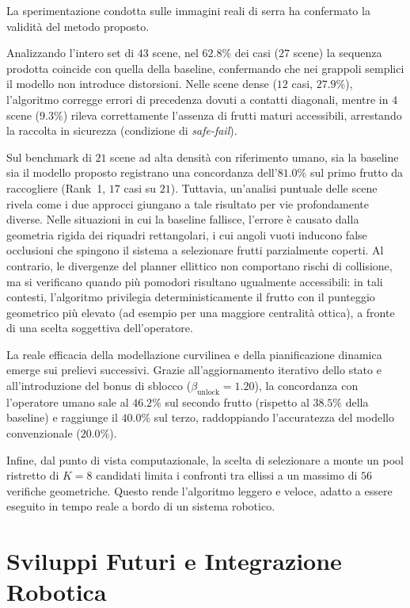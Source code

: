 La sperimentazione condotta sulle immagini reali di serra ha confermato la validità del 
metodo proposto. 

Analizzando l'intero set di $43$ scene, nel $62.8\%$ dei casi ($27$ scene) la sequenza 
prodotta coincide con quella della baseline, confermando che nei grappoli semplici il 
modello non introduce distorsioni. Nelle scene dense ($12$ casi, $27.9\%$), l'algoritmo 
corregge errori di precedenza dovuti a contatti diagonali, mentre in $4$ scene ($9.3\%$) 
rileva correttamente l'assenza di frutti maturi accessibili, arrestando la raccolta 
in sicurezza (condizione di \textit{safe-fail}).

Sul benchmark di $21$ scene ad alta densità con riferimento umano, sia la baseline sia 
il modello proposto registrano una concordanza dell'$81.0\%$ sul primo frutto da raccogliere 
(Rank~1, $17$ casi su $21$). Tuttavia, un'analisi puntuale delle scene rivela come i due 
approcci giungano a tale risultato per vie profondamente diverse. Nelle situazioni in cui 
la baseline fallisce, l'errore è causato dalla geometria rigida dei riquadri rettangolari, 
i cui angoli vuoti inducono false occlusioni che spingono il sistema a selezionare frutti 
parzialmente coperti. Al contrario, le divergenze del planner ellittico non comportano 
rischi di collisione, ma si verificano quando più pomodori risultano ugualmente accessibili: 
in tali contesti, l'algoritmo privilegia deterministicamente il frutto con il punteggio 
geometrico più elevato (ad esempio per una maggiore centralità ottica), a fronte di una 
scelta soggettiva dell'operatore.

La reale efficacia della modellazione curvilinea e della pianificazione dinamica emerge 
sui prelievi successivi. Grazie all'aggiornamento iterativo dello stato e all'introduzione 
del bonus di sblocco ($\beta_{\text{unlock}} = 1.20$), la concordanza con l'operatore umano 
sale al $46.2\%$ sul secondo frutto (rispetto al $38.5\%$ della baseline) e raggiunge il 
$40.0\%$ sul terzo, raddoppiando l'accuratezza del modello convenzionale ($20.0\%$).

Infine, dal punto di vista computazionale, la scelta di selezionare a monte un pool 
ristretto di $K = 8$ candidati limita i confronti tra ellissi a un massimo di $56$ 
verifiche geometriche. Questo rende l'algoritmo leggero e veloce, adatto a essere 
eseguito in tempo reale a bordo di un sistema robotico.


\section{Sviluppi Futuri e Integrazione Robotica}
\label{sec:sviluppi_futuri}

